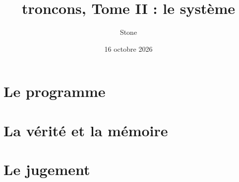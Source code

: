 \documentclass[11pt, a4paper, twoside, openright, parskip=false, headings=big,
               chapterprefix=true, numbers=noenddot, bibliography=totoc,
               listof=totoc]{scrbook}
\title{troncons, Tome II : le système}
\author{Stone}
\date{16 octobre 2026}
\newcommand{\Racine}{../..}               %
\begin{document}
\frontmatter


\tableofcontents
\listoffigures
\listoftables
\lstlistoflistings


\mainmatter


\part{Le programme}





\part{La vérité et la mémoire}



\part{Le jugement}




\appendix



\backmatter

\end{document}
